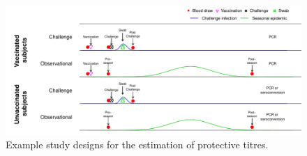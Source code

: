 \begin{figure}[htp]
	\centering
	\includegraphics[width=\linewidth]{../fig-studies/fig-studies.pdf}
	\caption{\footnotesize
	Example study designs for the estimation of protective titres.
}
\label{Studies}
\end{figure}
